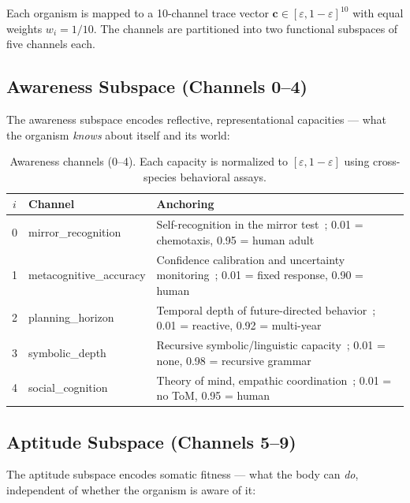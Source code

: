 \documentclass[
  aps,
  prd,
  twocolumn,
  superscriptaddress,
  nofootinbib,
  floatfix
]{revtex4-2}
\newcommand{\eps}{\varepsilon}
\newcommand{\tvec}{\mathbf{c}}
\begin{document}
Each organism is mapped to a 10-channel trace vector
$\tvec \in [\eps, 1{-}\eps]^{10}$ with equal weights
$w_i = 1/10$.  The channels are partitioned into two
functional subspaces of five channels each.

\subsection{Awareness Subspace (Channels 0--4)}

The awareness subspace encodes reflective, representational
capacities --- what the organism \emph{knows} about itself
and its world:

\begin{table}[h]
\caption{\label{tab:awareness}Awareness channels (0--4).
Each capacity is normalized to $[\eps, 1{-}\eps]$ using
cross-species behavioral assays.}
\begin{ruledtabular}
\begin{tabular}{clp{3.5cm}}
$i$ & Channel & Anchoring \\
\hline
0 & mirror\_recognition & Self-recognition in the mirror
    test~\cite{gallup1970}; 0.01 = chemotaxis,
    0.95 = human adult \\
1 & metacognitive\_accuracy & Confidence calibration and
    uncertainty monitoring~\cite{smith2009metacognition};
    0.01 = fixed response, 0.90 = human \\
2 & planning\_horizon & Temporal depth of future-directed
    behavior~\cite{suddendorf2007evolution};
    0.01 = reactive, 0.92 = multi-year \\
3 & symbolic\_depth & Recursive symbolic/linguistic
    capacity~\cite{hauser2002faculty};
    0.01 = none, 0.98 = recursive grammar \\
4 & social\_cognition & Theory of mind, empathic
    coordination~\cite{premack1978chimpanzee};
    0.01 = no ToM, 0.95 = human \\
\end{tabular}
\end{ruledtabular}
\end{table}

\subsection{Aptitude Subspace (Channels 5--9)}

The aptitude subspace encodes somatic fitness --- what the
body can \emph{do}, independent of whether the organism is
aware of it:
\end{document}
